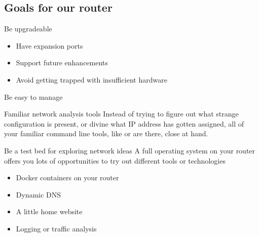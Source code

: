 \documentclass[bigger]{beamer}
\begin{document}
\subsection{Goals for our router}
\label{sec:org778996d}

\begin{frame}[label={sec:org8d79961}]{Be upgradeable}
  \begin{itemize}
  \item Have expansion ports
  \item Support future enhancements
  \item Avoid getting trapped with insufficient hardware
  \end{itemize}
\end{frame}

\begin{frame}[label={sec:org1c4cf14}]{Be easy to manage}
\begin{block}{Familiar network analysis tools}
Instead of trying to figure out what strange configuration is present, or
divine what IP address has gotten assigned, all of your familiar command
line tools, like or are there, close at
hand.
\end{block}
\end{frame}

\begin{frame}[label={sec:org100ce9b}]{Be a test bed for exploring network ideas}
A full operating system on your router offers you lots of opportunities to
try out different tools or technologies

\begin{itemize}
  \item Docker containers on your router

  \item<2-> Dynamic DNS
  \item<3-> A little home website
  \item<4-> Logging or traffic analysis
\end{itemize}
\end{frame}
\end{document}
